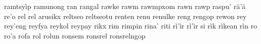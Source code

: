 \documentclass[a4paper]{article}
\begin{document}
ramtsyìp\hspace{2mm}
ramunong\hspace{2mm}
ran\hspace{2mm}
rangal\hspace{2mm}
rawke\hspace{2mm}
rawm\hspace{2mm}
rawmpxom\hspace{2mm}
rawn\hspace{2mm}
rawp\hspace{2mm}
raspu'\hspace{2mm}
rä'ä\hspace{2mm}
re'o\hspace{2mm}
rel\hspace{2mm}
rel arusikx\hspace{2mm}
reltseo\hspace{2mm}
reltseotu\hspace{2mm}
renten\hspace{2mm}
renu\hspace{2mm}
renulke\hspace{2mm}
reng\hspace{2mm}
rengop\hspace{2mm}
rewon\hspace{2mm}
rey\hspace{2mm}
rey'eng\hspace{2mm}
reyfya\hspace{2mm}
reykol\hspace{2mm}
reypay\hspace{2mm}
rikx\hspace{2mm}
rim\hspace{2mm}
rimpin\hspace{2mm}
rina'\hspace{2mm}
riti\hspace{2mm}
rì'ìr\hspace{2mm}
rì'ìr si\hspace{2mm}
rìk\hspace{2mm}
rìkean\hspace{2mm}
rìn\hspace{2mm}
ro\hspace{2mm}
ro'a\hspace{2mm}
rofa\hspace{2mm}
rol\hspace{2mm}
rolun\hspace{2mm}
ronsem\hspace{2mm}
ronsrel\hspace{2mm}
ronsrelngop\hspace{2mm}
\end{document}
